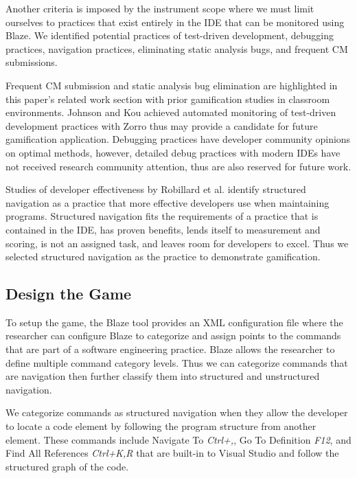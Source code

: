 \documentclass{sig-alternate}
\begin{document}
Another criteria is imposed by the instrument scope where we must limit ourselves to practices that exist entirely in the IDE that can be monitored using Blaze.  We identified potential practices of test-driven development, debugging practices, navigation practices,  eliminating static analysis bugs, and frequent CM submissions.  

Frequent CM submission and static analysis bug elimination are highlighted in this paper's related work section with prior gamification studies in classroom environments.  Johnson and Kou achieved automated monitoring of test-driven development practices with Zorro \cite{V:Johnson2007Automated} thus may provide a candidate for future gamification application.   
Debugging practices have developer community opinions on optimal methods, however, detailed debug practices with modern IDEs have not received research community attention, thus are also reserved for future work.  

Studies of developer effectiveness by Robillard et al.\cite{wbsnipes:Robillard2004How} identify structured navigation as a practice that more effective developers use when maintaining programs.   Structured navigation fits the requirements of a practice that is contained in the IDE, has proven benefits, lends itself to measurement and scoring, is not an assigned task, and leaves room for developers to excel.  Thus we selected structured navigation as the practice to demonstrate gamification.

\subsection{Design the Game}

To setup the game, the Blaze tool provides an XML configuration file where the researcher can configure Blaze to categorize and assign points to the commands that are part of a software engineering practice.  Blaze allows the researcher to define multiple command category levels.  Thus we can categorize commands that are navigation then further classify them into structured and unstructured navigation.  

We categorize commands as structured navigation when they allow the developer to locate a code element by following the program structure from another element.  These commands include Navigate To \textit{Ctrl+,}, Go To Definition \textit{F12}, and Find All References \textit{Ctrl+K,R} that are built-in to Visual Studio and follow the structured graph of the code.
\end{document}
